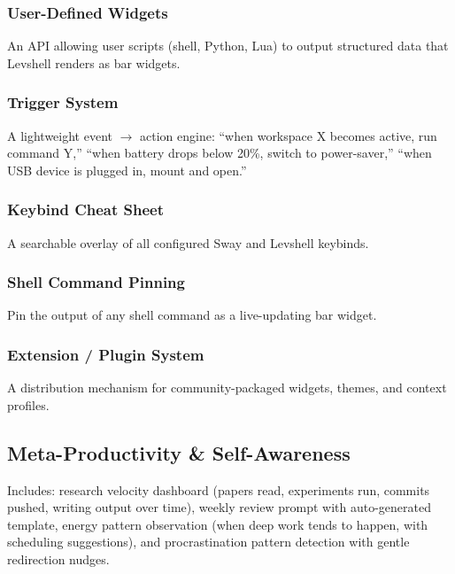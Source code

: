 \documentclass[11pt,a4paper]{article}
\begin{document}
\subsubsection{User-Defined Widgets}
An API allowing user scripts (shell, Python, Lua) to output structured data that Levshell renders as bar widgets.

\subsubsection{Trigger System}
A lightweight event $\to$ action engine: ``when workspace X becomes active, run command Y,'' ``when battery drops below 20\%, switch to power-saver,'' ``when USB device is plugged in, mount and open.''

\subsubsection{Keybind Cheat Sheet}
A searchable overlay of all configured Sway and Levshell keybinds.

\subsubsection{Shell Command Pinning}
Pin the output of any shell command as a live-updating bar widget.

\subsubsection{Extension / Plugin System}
A distribution mechanism for community-packaged widgets, themes, and context profiles.


\subsection{Meta-Productivity \& Self-Awareness}
\label{sec:features-meta}

Includes: research velocity dashboard (papers read, experiments run, commits pushed, writing output over time), weekly review prompt with auto-generated template, energy pattern observation (when deep work tends to happen, with scheduling suggestions), and procrastination pattern detection with gentle redirection nudges.


\end{document}
